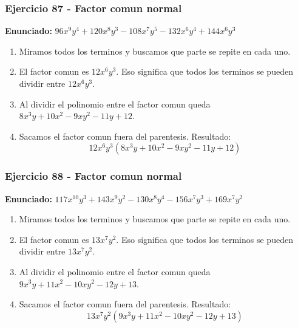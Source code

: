 \documentclass[11pt,a4paper]{article}
\begin{document}
\subsubsection*{Ejercicio 87 - Factor comun normal}
\textbf{Enunciado:} $ 96 x^{9} y^{4} + 120 x^{8} y^{3} - 108 x^{7} y^{5} - 132 x^{6} y^{4} + 144 x^{6} y^{3} $\par
\begin{enumerate}[leftmargin=2em]
\item Miramos todos los terminos y buscamos que parte se repite en cada uno.
\item El factor comun es \(12 x^{6} y^{3}\). Eso significa que todos los terminos se pueden dividir entre \(12 x^{6} y^{3}\).
\item Al dividir el polinomio entre el factor comun queda \(8 x^{3} y + 10 x^{2} - 9 x y^{2} - 11 y + 12\).
\item Sacamos el factor comun fuera del parentesis. Resultado: \[\boxed{12 x^{6} y^{3}\left(8 x^{3} y + 10 x^{2} - 9 x y^{2} - 11 y + 12\right)}\]
\end{enumerate}

\vspace{0.2cm}
\subsubsection*{Ejercicio 88 - Factor comun normal}
\textbf{Enunciado:} $ 117 x^{10} y^{3} + 143 x^{9} y^{2} - 130 x^{8} y^{4} - 156 x^{7} y^{3} + 169 x^{7} y^{2} $\par
\begin{enumerate}[leftmargin=2em]
\item Miramos todos los terminos y buscamos que parte se repite en cada uno.
\item El factor comun es \(13 x^{7} y^{2}\). Eso significa que todos los terminos se pueden dividir entre \(13 x^{7} y^{2}\).
\item Al dividir el polinomio entre el factor comun queda \(9 x^{3} y + 11 x^{2} - 10 x y^{2} - 12 y + 13\).
\item Sacamos el factor comun fuera del parentesis. Resultado: \[\boxed{13 x^{7} y^{2}\left(9 x^{3} y + 11 x^{2} - 10 x y^{2} - 12 y + 13\right)}\]
\end{enumerate}

\vspace{0.2cm}
\end{document}

